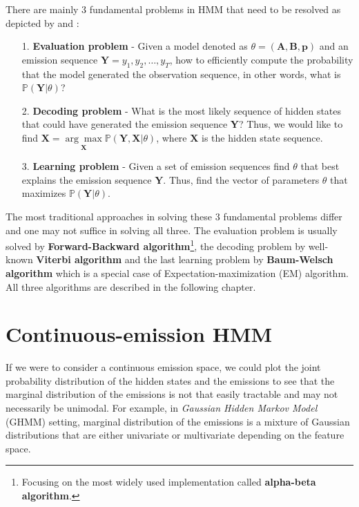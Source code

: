 There are mainly 3 fundamental problems in HMM that need to be resolved as depicted by \citep{Oliver2013} and \citep{Ching2005}:
\begin{itemize}
\item[1.] \textbf{Evaluation problem} - Given a model denoted as $\theta = (\textbf{A},\textbf{B},\textbf{p})$ and an emission sequence 
                                        $\textbf{Y} = y_1, y_2,\ldots,y_T$, how to efficiently compute the probability that the model generated the observation 
                                        sequence, in other words, what is $\mathbb{P}(\textbf{Y}|\theta)$? 
\item[2.] \textbf{Decoding problem} - What is the most likely sequence of hidden states that could have generated the emission sequence \textbf{Y}? 
                                      Thus, we would like to find $\textbf{X} = \underset{\textbf{X}}{\arg\max} \mathbb{P}(\textbf{Y},\textbf{X}|\theta)$, 
                                      where $\textbf{X}$ is the hidden state sequence. 
\item[3.] \textbf{Learning problem} - Given a set of emission sequences find $\theta$ that best explains the emission sequence $\textbf{Y}$. 
                                      Thus, find the vector of parameters $\theta$ that maximizes $\mathbb{P}(\textbf{Y}|\theta)$. 
\end{itemize}

The most traditional approaches in solving these 3 fundamental problems differ and one may not suffice in solving all three. 
The evaluation problem is usually solved by \textbf{Forward-Backward algorithm}\footnote{Focusing on the most widely used implementation called \textbf{alpha-beta algorithm}.}, the decoding problem by well-known \textbf{Viterbi algorithm} 
and the last learning problem by \textbf{Baum-Welsch algorithm} which is a special case of Expectation-maximization (EM) algorithm.
 All three algorithms are described in the following chapter.
 
\section{Continuous-emission HMM}
 
If we were to consider a continuous emission space, we could plot the joint probability distribution of the hidden states and the emissions to see that 
the marginal distribution of the emissions is not that easily tractable and may not necessarily be unimodal. For example, in \textit{Gaussian Hidden Markov Model} (GHMM) setting, 
marginal distribution of the emissions is a mixture of Gaussian distributions that are either univariate or multivariate depending on the feature space. \citep{Bishop2006}


